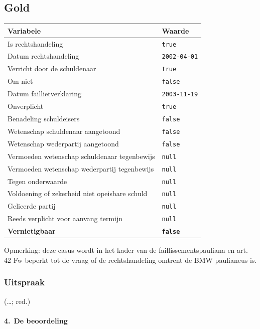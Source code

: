 \documentclass[
  dutch,
  a4paper,
]{article}
\begin{document}
\subsection{Gold}\label{gold-6}

\begin{center}
\small
\begin{tabular}{@{}p{8cm}p{2.6cm}@{}}
\toprule
Variabele & Waarde \\
\midrule
Is rechtshandeling & \texttt{true} \\
Datum rechtshandeling & \texttt{2002-04-01} \\
Verricht door de schuldenaar & \texttt{true} \\
Om niet & \texttt{false} \\
Datum faillietverklaring & \texttt{2003-11-19} \\
Onverplicht & \texttt{true} \\
Benadeling schuldeisers & \texttt{false} \\
Wetenschap schuldenaar aangetoond & \texttt{false} \\
Wetenschap wederpartij aangetoond & \texttt{false} \\
Vermoeden wetenschap schuldenaar tegenbewijs & \texttt{null} \\
Vermoeden wetenschap wederpartij tegenbewijs & \texttt{null} \\
Tegen onderwaarde & \texttt{null} \\
Voldoening of zekerheid niet opeisbare schuld & \texttt{null} \\
Gelieerde partij & \texttt{null} \\
Reeds verplicht voor aanvang termijn & \texttt{null} \\
\textbf{Vernietigbaar} & \textbf{\texttt{false}} \\
\bottomrule
\end{tabular}
\end{center}

Opmerking: deze casus wordt in het kader van de faillissementspauliana en art. 42 Fw beperkt tot de vraag of de rechtshandeling omtrent de BMW paulianeus is.

\subsubsection{Uitspraak}\label{uitspraak-6}

(\ldots; red.)

\paragraph{4. De beoordeling}\label{de-beoordeling-2}
\end{document}
